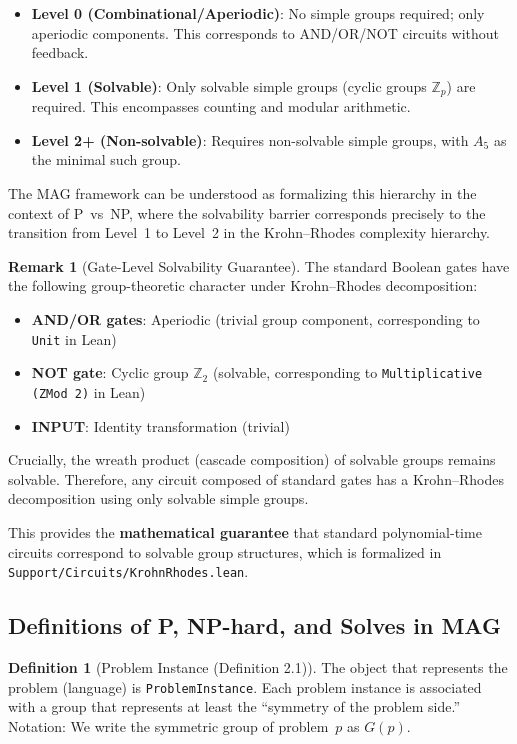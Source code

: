 \documentclass[11pt,a4paper]{article}
\theoremstyle{plain}
\theoremstyle{definition}
\newtheorem{definition}[theorem]{Definition}
\newtheorem{remark}[theorem]{Remark}
\newcommand{\Aalt}{A_5}
\newcommand{\lean}[1]{\texttt{#1}}
\newcommand{\Zp}{\mathbb{Z}_p}
\begin{document}
\begin{itemize}[nosep]
\item \textbf{Level 0 (Combinational/Aperiodic)}: No simple groups required; only aperiodic components. This corresponds to AND/OR/NOT circuits without feedback.
\item \textbf{Level 1 (Solvable)}: Only solvable simple groups (cyclic groups $\Zp$) are required. This encompasses counting and modular arithmetic.
\item \textbf{Level 2+ (Non-solvable)}: Requires non-solvable simple groups, with $\Aalt$ as the minimal such group.
\end{itemize}

The MAG framework can be understood as formalizing this hierarchy in the context of P~vs~NP, where the solvability barrier corresponds precisely to the transition from Level~1 to Level~2 in the Krohn--Rhodes complexity hierarchy.

\begin{remark}[Gate-Level Solvability Guarantee]
The standard Boolean gates have the following group-theoretic character under Krohn--Rhodes decomposition:
\begin{itemize}[nosep]
\item \textbf{AND/OR gates}: Aperiodic (trivial group component, corresponding to \lean{Unit} in Lean)
\item \textbf{NOT gate}: Cyclic group $\mathbb{Z}_2$ (solvable, corresponding to \lean{Multiplicative (ZMod 2)} in Lean)
\item \textbf{INPUT}: Identity transformation (trivial)
\end{itemize}
Crucially, the wreath product (cascade composition) of solvable groups remains solvable. Therefore, any circuit composed of standard gates has a Krohn--Rhodes decomposition using only solvable simple groups.

This provides the \textbf{mathematical guarantee} that standard polynomial-time circuits correspond to solvable group structures, which is formalized in \lean{Support/Circuits/KrohnRhodes.lean}.
\end{remark}

\subsection{Definitions of P, NP-hard, and Solves in MAG}

\begin{definition}[Problem Instance (Definition 2.1)]
The object that represents the problem (language) is \lean{ProblemInstance}. Each problem instance is associated with a group that represents at least the ``symmetry of the problem side.'' Notation: We write the symmetric group of problem~$p$ as $G(p)$.
\end{definition}
\end{document}
